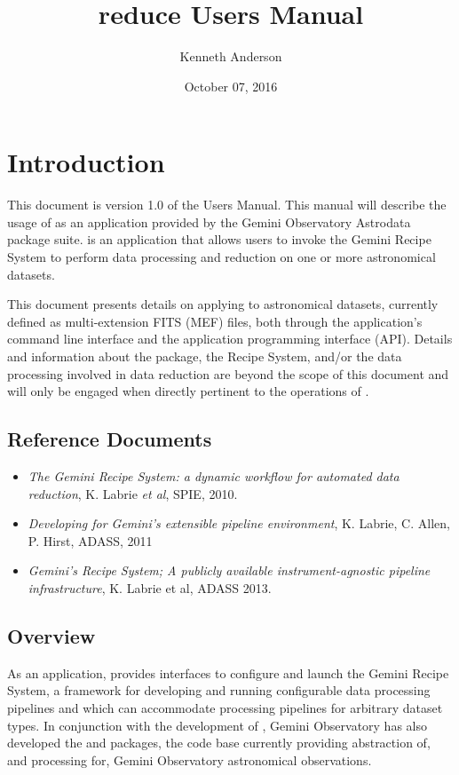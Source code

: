 \documentclass[letterpaper,10pt,english]{sphinxmanual}
\title{reduce Users Manual}
\date{October 07, 2016}
\author{Kenneth Anderson}
\begin{document}
\maketitle
\tableofcontents
{}\label{index-latex::doc}



\chapter{Introduction}
\label{intro:introduction}\label{intro:reduce-users-manual}\label{intro::doc}
This document is version 1.0 of the  Users Manual. This manual will
describe the usage of  as an application provided by the Gemini Observatory
Astrodata package suite.  is an application that allows users to invoke the
Gemini Recipe System to perform data processing and reduction on one or more
astronomical datasets.

This document presents details on applying  to astronomical datasets,
currently defined as multi-extension FITS (MEF) files, both through the application's
command line interface and the application programming interface (API). Details and
information about the  package, the Recipe System, and/or the data
processing involved in data reduction are beyond the scope of this document and
will only be engaged when directly pertinent to the operations of .


\section{Reference Documents}
\label{intro:reference-documents}\begin{itemize}
\item {} 
\emph{The Gemini Recipe System: a dynamic workflow for automated data reduction},
K. Labrie \emph{et al}, SPIE, 2010.

\item {} 
\emph{Developing for Gemini’s extensible pipeline environment}, K. Labrie,
C. Allen, P. Hirst, ADASS, 2011

\item {} 
\emph{Gemini's Recipe System; A publicly available instrument-agnostic pipeline
infrastructure}, K. Labrie et al, ADASS 2013.

\end{itemize}


\section{Overview}
\label{intro:overview}
As an application,  provides interfaces to configure and launch the
Gemini Recipe System, a framework for developing and running configurable data
processing pipelines and which can accommodate processing pipelines for arbitrary
dataset types. In conjunction with the development of , Gemini
Observatory has also developed the  and 
packages, the code base currently providing abstraction of, and processing for,
Gemini Observatory astronomical observations.
\end{document}
